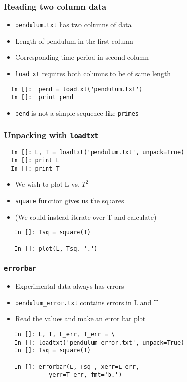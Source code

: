 \begin{frame}[fragile]
  \frametitle{Reading two column data}
  \begin{itemize}
  \item \texttt{pendulum.txt} has two columns of data
  \item Length of pendulum in the first column 
  \item Corresponding time period in second column
  \item \texttt{loadtxt} requires both columns to be of same length
  \end{itemize}
  \begin{lstlisting}
  In []:  pend = loadtxt('pendulum.txt')
  In []:  print pend
  \end{lstlisting}
  \begin{itemize}
  \item \texttt{pend} is not a simple sequence like \texttt{primes}
  \end{itemize}
\end{frame}

\begin{frame}[fragile]
  \frametitle{Unpacking with \texttt{loadtxt}}
  \begin{lstlisting}
  In []: L, T = loadtxt('pendulum.txt', unpack=True)
  In []: print L
  In []: print T
  \end{lstlisting}
  \begin{itemize}
  \item We wish to plot L vs. $T^2$
  \item \texttt{square} function gives us the squares
  \item (We could instead iterate over T and calculate)
  \end{itemize}
  \begin{lstlisting}
   In []: Tsq = square(T)

   In []: plot(L, Tsq, '.')
  \end{lstlisting}
\end{frame}

\begin{frame}[fragile]
  \frametitle{\texttt{errorbar}}
  \begin{itemize}
  \item Experimental data always has errors
  \item \texttt{pendulum\_error.txt} contains errors in L and T
  \item Read the values and make an error bar plot
  \end{itemize}
  \begin{lstlisting}
   In []: L, T, L_err, T_err = \
   In []: loadtxt('pendulum_error.txt', unpack=True)
   In []: Tsq = square(T)

   In []: errorbar(L, Tsq , xerr=L_err, 
             yerr=T_err, fmt='b.')
  \end{lstlisting}
\end{frame}

